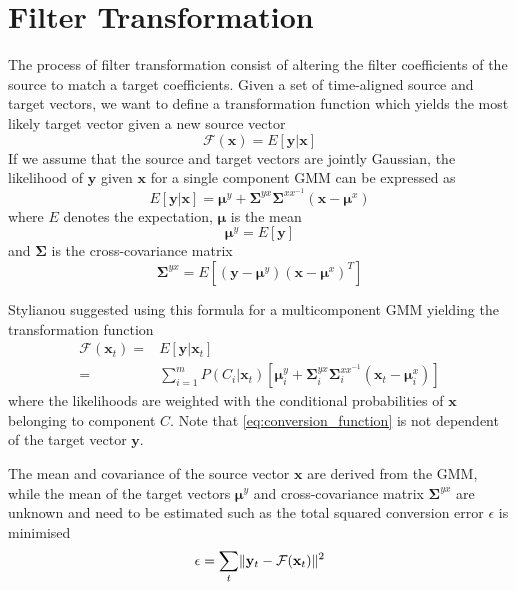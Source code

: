 \section{Filter Transformation} %
\label{sec:conversion_function}
The process of filter transformation consist of altering the filter coefficients of the source to match a target coefficients. Given a set of time-aligned source and target vectors, we want to define a transformation function which yields the most likely target vector given a new source vector
\begin{equation}
	\mathcal{F}(\mathbf{x}) = E[\mathbf{y}\vert \mathbf{x}]
\end{equation}
If we assume that the source and target vectors are jointly Gaussian, the likelihood of $\mathbf{y}$ given $\mathbf{x}$ for a single component GMM can be expressed as \cite{kay93}
\begin{equation}
	E[\mathbf{y}\vert \mathbf{x}] = \boldsymbol{\mu}^y + \mathbf{\Sigma}^{yx} \mathbf{\Sigma}^{xx^{-1}} (\mathbf{x}-\boldsymbol{\mu}^x)
\end{equation}
where $E$ denotes the expectation, $\boldsymbol{\mu}$ is the mean
\begin{equation}
	\boldsymbol{\mu}^y = E[\mathbf{y}]
\end{equation}
and $\mathbf{\Sigma}$ is the cross-covariance matrix
\begin{equation}
	\mathbf{\Sigma}^{yx} = E[(\mathbf{y}-\boldsymbol{\mu}^y)(\mathbf{x}-\boldsymbol{\mu}^x)^T]
\end{equation}

Stylianou \etal \cite{stylianou95} suggested using this formula for a multicomponent GMM yielding the transformation function
\begin{equation}
	\label{eq:conversion_function}
	\begin{split}
		\mathcal{F}(\mathbf{x}_t) =& E[\mathbf{y}\vert \mathbf{x}_t]\\
		=& \sum_{i=1}^{m}P(C_i \vert \mathbf{x}_t)[\boldsymbol{\mu}_i^y + \mathbf{\Sigma}_i^{yx} \mathbf{\Sigma}_i^{xx^{-1}} (\mathbf{x}_t-\boldsymbol{\mu}_i^x)]
	\end{split}
\end{equation}
where the likelihoods are weighted with the conditional probabilities of $\mathbf{x}$ belonging to component $C$. Note that \eqref{eq:conversion_function} is not dependent of the target vector $\mathbf{y}$.

The mean and covariance of the source vector $\mathbf{x}$ are derived from the GMM, while the mean of the target vectors $\boldsymbol{\mu}^y$ and cross-covariance matrix $\mathbf{\Sigma}^{yx}$ are unknown and need to be estimated such as the total squared conversion error $\epsilon$ is minimised
\begin{equation}
	\label{eq:conversion_error}
	\epsilon = \sum_{t} \lVert\mathbf{y}_t - \mathcal{F}(\mathbf{x}_t)\rVert^2
\end{equation}

